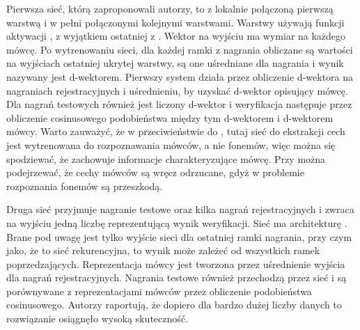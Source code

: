 Pierwsza sieć, którą zaproponowali autorzy, to  z lokalnie połączoną pierwszą warstwą i w pełni połączonymi
kolejnymi warstwami. Warstwy używają funkcji aktywacji , z wyjątkiem
ostatniej z . Wektor na wyjściu ma wymiar na każdego mówcę. Po wytrenowaniu sieci, dla każdej
ramki z nagrania obliczane są wartości na wyjściach ostatniej ukrytej warstwy,
są one uśredniane dla nagrania i wynik nazywany jest d-wektorem. Pierwszy system działa przez obliczenie d-wektora
na nagraniach rejestracyjnych i uśrednieniu, by uzyskać d-wektor opisujący mówcę.
Dla nagrań testowych również jest liczony d-wektor i weryfikacja następuje przez obliczenie cosinusowego podobieństwa
między tym d-wektorem i d-wektorem mówcy. Warto zauważyć, że w przeciwieństwie
do , tutaj sieć do ekstrakcji cech jest wytrenowana do rozpoznawania mówców, a nie
fonemów, więc można się spodziewać, że zachowuje informacje charakteryzujące mówcę.
Przy  można podejrzewać, że cechy mówców są wręcz odrzucane, gdyż w problemie
rozpoznania fonemów są przeszkodą.

Druga sieć przyjmuje nagranie testowe oraz kilka nagrań rejestracyjnych i zwraca na wyjściu jedną liczbę
reprezentującą wynik weryfikacji. Sieć ma architekturę . Brane pod uwagę
jest tylko wyjście sieci dla ostatniej ramki nagrania, przy czym jako, że to sieć rekurencyjna,
to wynik może zależeć od wszystkich ramek poprzedzających. Reprezentacja mówcy jest tworzona przez uśrednienie
wyjścia  dla nagrań rejestracyjnych. Nagrania testowe również przechodzą przez sieć i są
porównywane z reprezentacjami mówców przez obliczenie podobieństwa cosinusowego. Autorzy raportują, że dopiero
dla bardzo dużej liczby danych to rozwiązanie osiągnęło wysoką skuteczność.

